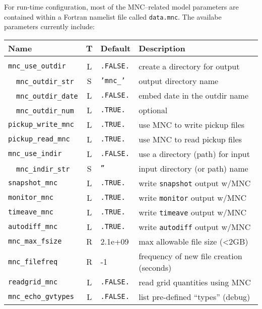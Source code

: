 For run-time configuration, most of the MNC--related model parameters
are contained within a Fortran namelist file called
\texttt{data.mnc}.  The availabe parameters currently include:
\begin{center}
  {\footnotesize
    \begin{tabular}[htb]{|l|c|l|l|}\hline
      \textbf{Name}  &  \textbf{T}  &  
      \textbf{Default}  &  \textbf{Description}  \\\hline
      &  &  &  \\
      \texttt{mnc\_use\_outdir}  &  L  & \texttt{.FALSE.}  &  
      create a directory for output  \\
      \ \ \texttt{mnc\_outdir\_str}  &  S  & \texttt{'mnc\_'}  &  
      output directory name \\
      \ \ \texttt{mnc\_outdir\_date}  &  L  & \texttt{.FALSE.}  &  
      embed date in the outdir name  \\
      \ \ \texttt{mnc\_outdir\_num}  &  L  & \texttt{.TRUE.}  &  
      optional  \\
      \texttt{pickup\_write\_mnc}  &  L  & \texttt{.TRUE.}  &  
      use MNC to write pickup files  \\
      \texttt{pickup\_read\_mnc}  &  L  & \texttt{.TRUE.}  &  
      use MNC to read pickup files  \\
      \texttt{mnc\_use\_indir}  &  L  & \texttt{.FALSE.}  &  
      use a directory (path) for input  \\
      \ \ \texttt{mnc\_indir\_str}  &  S  & \texttt{''}  &  
      input directory (or path) name  \\
      \texttt{snapshot\_mnc}  &  L  & \texttt{.TRUE.}  &  
      write \texttt{snapshot} output w/MNC  \\
      \texttt{monitor\_mnc}  &  L  & \texttt{.TRUE.}  &  
      write \texttt{monitor} output w/MNC  \\
      \texttt{timeave\_mnc}  &  L  & \texttt{.TRUE.}  &  
      write \texttt{timeave} output w/MNC  \\
      \texttt{autodiff\_mnc}  &  L  & \texttt{.TRUE.}  &  
      write \texttt{autodiff} output w/MNC  \\
      \texttt{mnc\_max\_fsize}  &  R  & 2.1e+09  &  
      max allowable file size (<2GB)  \\
      \texttt{mnc\_filefreq}  &  R  &  -1  &  
      frequency of new file creation (seconds)  \\
      \texttt{readgrid\_mnc}  &  L  &  \texttt{.FALSE.}  &  
      read grid quantities using MNC  \\
      \texttt{mnc\_echo\_gvtypes}  &  L  & \texttt{.FALSE.}  &  
      list pre-defined ``types'' (debug)   \\\hline
    \end{tabular}
  }
\end{center}

